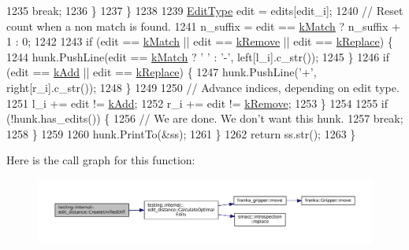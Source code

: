 \begin{DoxyCode}
1235           \textcolor{keywordflow}{break};
1236         \}
1237       \}
1238 
1239       \hyperlink{namespacetesting_1_1internal_1_1edit__distance_ad46aa6da12aec1a3f166310478b53a08}{EditType} edit = edits[edit\_i];
1240       \textcolor{comment}{// Reset count when a non match is found.}
1241       n\_suffix = edit == \hyperlink{namespacetesting_1_1internal_1_1edit__distance_ad46aa6da12aec1a3f166310478b53a08a7bdb9c74613a94f21b7489e0b5640a63}{kMatch} ? n\_suffix + 1 : 0;
1242 
1243       \textcolor{keywordflow}{if} (edit == \hyperlink{namespacetesting_1_1internal_1_1edit__distance_ad46aa6da12aec1a3f166310478b53a08a7bdb9c74613a94f21b7489e0b5640a63}{kMatch} || edit == \hyperlink{namespacetesting_1_1internal_1_1edit__distance_ad46aa6da12aec1a3f166310478b53a08a814768ef6cd0264a0a10b1e701a63e78}{kRemove} || edit == \hyperlink{namespacetesting_1_1internal_1_1edit__distance_ad46aa6da12aec1a3f166310478b53a08afdbf30ecf9f32f60c646a34a358615f2}{kReplace}) \{
1244         hunk.PushLine(edit == \hyperlink{namespacetesting_1_1internal_1_1edit__distance_ad46aa6da12aec1a3f166310478b53a08a7bdb9c74613a94f21b7489e0b5640a63}{kMatch} ? \textcolor{charliteral}{' '} : \textcolor{charliteral}{'-'}, left[l\_i].c\_str());
1245       \}
1246       \textcolor{keywordflow}{if} (edit == \hyperlink{namespacetesting_1_1internal_1_1edit__distance_ad46aa6da12aec1a3f166310478b53a08a63400b073f5b311a87d568b5ae27ffe8}{kAdd} || edit == \hyperlink{namespacetesting_1_1internal_1_1edit__distance_ad46aa6da12aec1a3f166310478b53a08afdbf30ecf9f32f60c646a34a358615f2}{kReplace}) \{
1247         hunk.PushLine(\textcolor{charliteral}{'+'}, right[r\_i].c\_str());
1248       \}
1249 
1250       \textcolor{comment}{// Advance indices, depending on edit type.}
1251       l\_i += edit != \hyperlink{namespacetesting_1_1internal_1_1edit__distance_ad46aa6da12aec1a3f166310478b53a08a63400b073f5b311a87d568b5ae27ffe8}{kAdd};
1252       r\_i += edit != \hyperlink{namespacetesting_1_1internal_1_1edit__distance_ad46aa6da12aec1a3f166310478b53a08a814768ef6cd0264a0a10b1e701a63e78}{kRemove};
1253     \}
1254 
1255     \textcolor{keywordflow}{if} (!hunk.has\_edits()) \{
1256       \textcolor{comment}{// We are done. We don't want this hunk.}
1257       \textcolor{keywordflow}{break};
1258     \}
1259 
1260     hunk.PrintTo(&ss);
1261   \}
1262   \textcolor{keywordflow}{return} ss.str();
1263 \}
\end{DoxyCode}
Here is the call graph for this function\+:
\nopagebreak
\begin{figure}[H]
\begin{center}
\leavevmode
\includegraphics[width=350pt]{namespacetesting_1_1internal_1_1edit__distance_ac4c24a581ff433d7aca7ed12c9133fb1_cgraph}
\end{center}
\end{figure}
